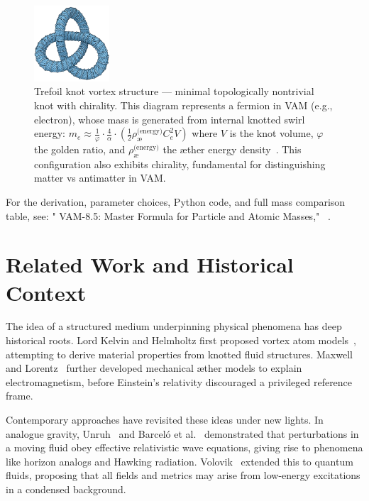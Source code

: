 \begin{figure}[H]
    \centering
    \includegraphics[width=0.25\textwidth]{figures/Tre-foil}
    \caption{Trefoil knot vortex structure — minimal topologically nontrivial knot with chirality. This diagram represents a fermion in VAM (e.g., electron), whose mass is generated from internal knotted swirl energy:
        \(
            m_e \approx \frac{1}{\varphi} \cdot \frac{4}{\alpha} \cdot \left( \frac{1}{2} \rho_{\text{\ae}}^{\text{(energy)}} C_e^2 V \right)
        \)
        where $V$ is the knot volume, $\varphi$ the golden ratio, and $\rho_{\text{\ae}}^{\text{(energy)}}$ the æther energy density~\cite{VAM-0, VAM-1}. This configuration also exhibits chirality, fundamental for distinguishing matter vs antimatter in VAM.}
    \label{fig:trefoil-vortex}
\end{figure}

For the derivation, parameter choices, Python code, and full mass comparison table, see: "  VAM-8.5: Master Formula for Particle and Atomic Masses," ~\cite{VAM-8, VAM-8.5}.

\section{Related Work and Historical Context}

    The idea of a structured medium underpinning physical phenomena has deep historical roots. Lord Kelvin and Helmholtz first proposed vortex atom models~\cite{thomson1867}, attempting to derive material properties from knotted fluid structures. Maxwell~\cite{maxwell1861} and Lorentz~\cite{lorentz1904} further developed mechanical æther models to explain electromagnetism, before Einstein's relativity discouraged a privileged reference frame.

    Contemporary approaches have revisited these ideas under new lights. In analogue gravity, Unruh~\cite{unruh1981} and Barceló et al.~\cite{barcelo2011} demonstrated that perturbations in a moving fluid obey effective relativistic wave equations, giving rise to phenomena like horizon analogs and Hawking radiation. Volovik~\cite{volovik2003} extended this to quantum fluids, proposing that all fields and metrics may arise from low-energy excitations in a condensed background.


